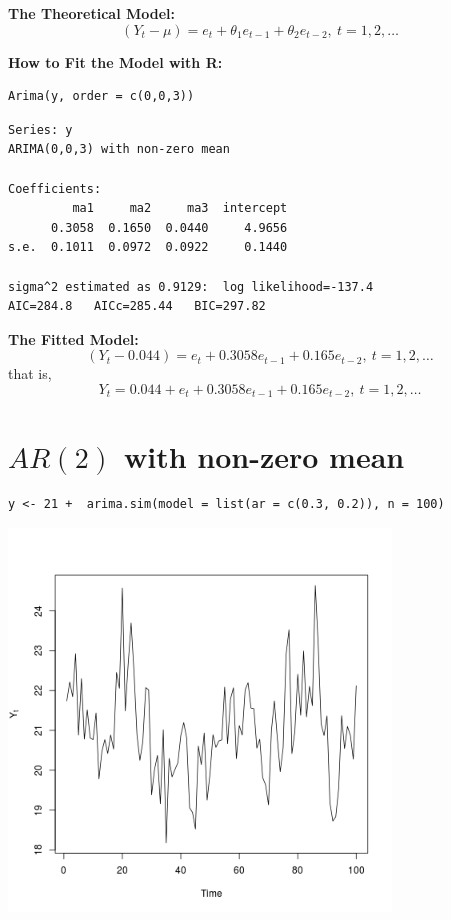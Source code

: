 \documentclass[12pt]{article}
\begin{document}
\noindent
\textbf{The Theoretical Model:} 
\[
(Y_{t} - \mu) = e_{t} + \theta_{1}e_{t - 1} + \theta_{2}e_{t - 2},\ t = 1,2,\ldots
\]

\noindent
\textbf{How to Fit the Model with R:}

\begin{verbatim}
Arima(y, order = c(0,0,3))
\end{verbatim}





\begin{verbatim}
Series: y 
ARIMA(0,0,3) with non-zero mean 

Coefficients:
         ma1     ma2     ma3  intercept
      0.3058  0.1650  0.0440     4.9656
s.e.  0.1011  0.0972  0.0922     0.1440

sigma^2 estimated as 0.9129:  log likelihood=-137.4
AIC=284.8   AICc=285.44   BIC=297.82
\end{verbatim}

\noindent
\textbf{The Fitted Model:} 
\[
(Y_{t} - 0.044) = e_{t} + 0.3058 e_{t - 1} + 0.165 e_{t - 2},\ t = 1,2,\ldots
\]
that is,
\[
Y_{t} = 0.044 + e_{t} + 0.3058 e_{t - 1} + 0.165 e_{t - 2},\ t = 1,2,\ldots
\]
\section*{$AR(2)$ with non-zero mean}
\label{sec-4}


\begin{verbatim}
y <- 21 +  arima.sim(model = list(ar = c(0.3, 0.2)), n = 100)
\end{verbatim}





\includegraphics[width=4.0in]{img/ar2nzm.png}
\end{document}
